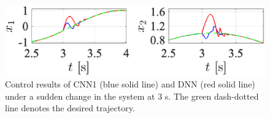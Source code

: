 \documentclass[letterpaper, 10 pt, conference]{ieeeconf}  %
\begin{document}


\begin{figure}[!t]
    \centering
    \includegraphics[width=\linewidth]{Fig8}
    \caption{Control results of CNN1 (blue solid line) and DNN (red solid line) under a sudden change in the system at $3$ s. The green dash-dotted line denotes the desired trajectory.}
    \label{fig: FCN vs CNN}
\end{figure}


\end{document}
